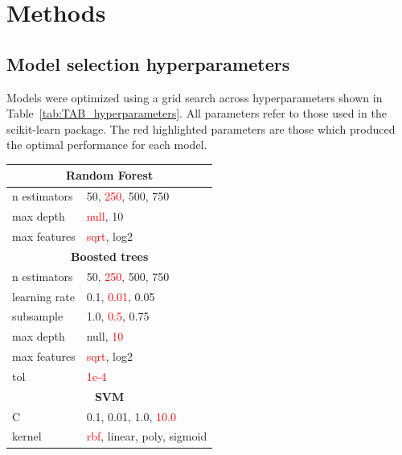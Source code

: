 \documentclass[11pt,a4paper]{article}
\begin{document}
\section{Methods}
\subsection*{Model selection hyperparameters}
Models were optimized using a grid search across hyperparameters shown in Table~\ref{tab:TAB_hyperparameters}. All parameters refer to those used in the scikit-learn package. The red highlighted parameters are those which produced the optimal performance for each model.
\begin{table}[]
    \centering
    \begin{tabular}{ll}
    \hline
    \multicolumn{2}{||c||}{\textbf{Random Forest}} \\ \hline
    \multicolumn{1}{|l|}{n estimators} & \multicolumn{1}{l|}{50, \textcolor{red}{250}, 500, 750} \\ \hline
    \multicolumn{1}{|l|}{max depth}    & \multicolumn{1}{l|}{\textcolor{red}{null}, 10}   \\ \hline
    \multicolumn{1}{|l|}{max features}    & \multicolumn{1}{l|}{\textcolor{red}{sqrt}, log2}   \\ \hline
    \multicolumn{2}{||c||}{\textbf{Boosted trees}} \\ \hline
    \multicolumn{1}{|l|}{n estimators} & \multicolumn{1}{l|}{50, \textcolor{red}{250}, 500, 750} \\ \hline
    \multicolumn{1}{|l|}{learning rate} & \multicolumn{1}{l|}{0.1, \textcolor{red}{0.01}, 0.05} \\ \hline
    \multicolumn{1}{|l|}{subsample} & \multicolumn{1}{l|}{1.0, \textcolor{red}{0.5}, 0.75} \\ \hline
    \multicolumn{1}{|l|}{max depth}    & \multicolumn{1}{l|}{null, \textcolor{red}{10}}   \\ \hline
    \multicolumn{1}{|l|}{max features}    & \multicolumn{1}{l|}{\textcolor{red}{sqrt}, log2}   \\ \hline
    \multicolumn{1}{|l|}{tol}    & \multicolumn{1}{l|}{\textcolor{red}{1e-4}} \\ \hline
    \multicolumn{2}{||c||}{\textbf{SVM}} \\ \hline
    \multicolumn{1}{|l|}{C} & \multicolumn{1}{l|}{0.1, 0.01, 1.0, \textcolor{red}{10.0}} \\ \hline
    \multicolumn{1}{|l|}{kernel} & \multicolumn{1}{l|}{\textcolor{red}{rbf}, linear, poly, sigmoid} \\ \hline

\end{tabular}
\end{table}
\end{document}
